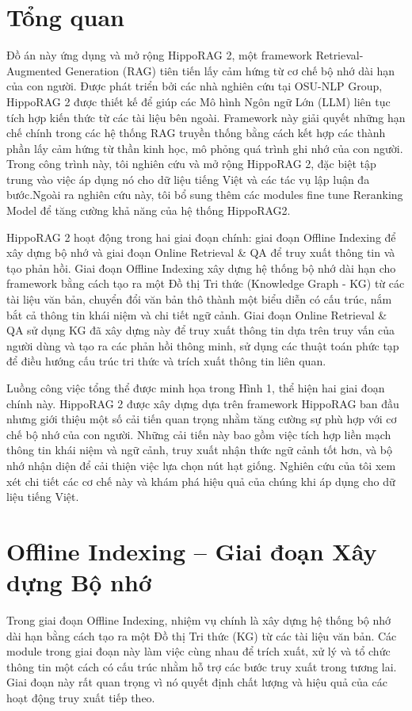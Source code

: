 \documentclass[../main.tex]{subfiles}
\begin{document}
\section{Tổng quan}
Đồ án này ứng dụng và mở rộng HippoRAG 2, một framework Retrieval-Augmented Generation (RAG) tiên tiến lấy cảm hứng từ cơ chế bộ nhớ dài hạn của con người. Được phát triển bởi các nhà nghiên cứu tại OSU-NLP Group, HippoRAG 2 được thiết kế để giúp các Mô hình Ngôn ngữ Lớn (LLM) liên tục tích hợp kiến thức từ các tài liệu bên ngoài. Framework này giải quyết những hạn chế chính trong các hệ thống RAG truyền thống bằng cách kết hợp các thành phần lấy cảm hứng từ thần kinh học, mô phỏng quá trình ghi nhớ của con người. Trong công trình này, tôi nghiên cứu và mở rộng HippoRAG 2, đặc biệt tập trung vào việc áp dụng nó cho dữ liệu tiếng Việt và các tác vụ lập luận đa bước.Ngoài ra nghiên cứu này, tôi bổ sung thêm các modules fine tune Reranking Model để tăng cường khả năng của hệ thống HippoRAG2. 


HippoRAG 2 hoạt động trong hai giai đoạn chính: giai đoạn Offline Indexing để xây dựng bộ nhớ và giai đoạn Online Retrieval \& QA để truy xuất thông tin và tạo phản hồi. Giai đoạn Offline Indexing xây dựng hệ thống bộ nhớ dài hạn cho framework bằng cách tạo ra một Đồ thị Tri thức (Knowledge Graph - KG) từ các tài liệu văn bản, chuyển đổi văn bản thô thành một biểu diễn có cấu trúc, nắm bắt cả thông tin khái niệm và chi tiết ngữ cảnh. Giai đoạn Online Retrieval \& QA sử dụng KG đã xây dựng này để truy xuất thông tin dựa trên truy vấn của người dùng và tạo ra các phản hồi thông minh, sử dụng các thuật toán phức tạp để điều hướng cấu trúc tri thức và trích xuất thông tin liên quan.

Luồng công việc tổng thể được minh họa trong Hình 1, thể hiện hai giai đoạn chính này. HippoRAG 2 được xây dựng dựa trên framework HippoRAG ban đầu nhưng giới thiệu một số cải tiến quan trọng nhằm tăng cường sự phù hợp với cơ chế bộ nhớ của con người. Những cải tiến này bao gồm việc tích hợp liền mạch thông tin khái niệm và ngữ cảnh, truy xuất nhận thức ngữ cảnh tốt hơn, và bộ nhớ nhận diện để cải thiện việc lựa chọn nút hạt giống. Nghiên cứu của tôi xem xét chi tiết các cơ chế này và khám phá hiệu quả của chúng khi áp dụng cho dữ liệu tiếng Việt.

\section{Offline Indexing – Giai đoạn Xây dựng Bộ nhớ}
Trong giai đoạn Offline Indexing, nhiệm vụ chính là xây dựng hệ thống bộ nhớ dài hạn bằng cách tạo ra một Đồ thị Tri thức (KG) từ các tài liệu văn bản. Các module trong giai đoạn này làm việc cùng nhau để trích xuất, xử lý và tổ chức thông tin một cách có cấu trúc nhằm hỗ trợ các bước truy xuất trong tương lai. Giai đoạn này rất quan trọng vì nó quyết định chất lượng và hiệu quả của các hoạt động truy xuất tiếp theo.
\end{document}
